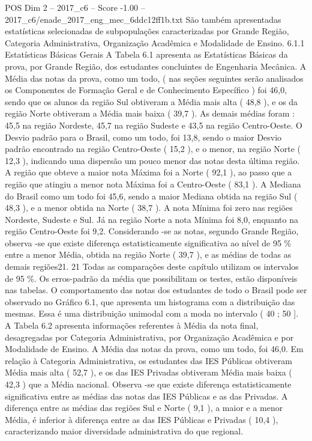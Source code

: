 \begin{textsample}{POS Dim 2 – 2017\_c6 – Score -1.00 – 2017\_c6/enade\_2017\_eng\_mec\_6ddc12ff1b.txt}
São também apresentadas estatísticas selecionadas de subpopulações caracterizadas por Grande Região, Categoria Administrativa, Organização Acadêmica e Modalidade de Ensino. 6.1.1 Estatísticas Básicas Gerais A Tabela 6.1 apresenta as Estatísticas Básicas da prova, por Grande Região, dos estudantes concluintes de Engenharia Mecânica.
A Média das notas da prova, como um todo, ( nas seções seguintes serão analisados os Componentes de Formação Geral e de Conhecimento Específico ) foi 46,0, sendo que os alunos da região Sul obtiveram a Média mais alta ( 48,8 ), e os da região Norte obtiveram a Média mais baixa ( 39,7 ).
As demais médias foram : 45,5 na região Nordeste, 45,7 na região Sudeste e 43,5 na região Centro-Oeste.
O Desvio padrão para o Brasil, como um todo, foi 13,8, sendo o maior Desvio padrão encontrado na região Centro-Oeste ( 15,2 ), e o menor, na região Norte ( 12,3 ), indicando uma dispersão um pouco menor das notas desta última região.
A região que obteve a maior nota Máxima foi a Norte ( 92,1 ), ao passo que a região que atingiu a menor nota Máxima foi a Centro-Oeste ( 83,1 ).
A Mediana do Brasil como um todo foi 45,6, sendo a maior Mediana obtida na região Sul ( 48,3 ), e a menor obtida na Norte ( 38,7 ).
A nota Mínima foi zero nas regiões Nordeste, Sudeste e Sul.
Já na região Norte a nota Mínima foi 8,0, enquanto na região Centro-Oeste foi 9,2.
Considerando -se as notas, segundo Grande Região, observa -se que existe diferença estatisticamente significativa ao nível de 95 \% entre a menor Média, obtida na região Norte ( 39,7 ), e as médias de todas as demais regiões21. 21 Todas as comparações deste capítulo utilizam os intervalos de 95 \%.
Os erros-padrão da média que possibilitam os testes, estão disponíveis nas tabelas.
O comportamento das notas dos estudantes de todo o Brasil pode ser observado no Gráfico 6.1, que apresenta um histograma com a distribuição das mesmas.
Essa é uma distribuição unimodal com a moda no intervalo ( 40 ; 50 ].
A Tabela 6.2 apresenta informações referentes à Média da nota final, desagregadas por Categoria Administrativa, por Organização Acadêmica e por Modalidade de Ensino.
A Média das notas da prova, como um todo, foi 46,0.
Em relação à Categoria Administrativa, os estudantes das IES Públicas obtiveram Média mais alta ( 52,7 ), e os das IES Privadas obtiveram Média mais baixa ( 42,3 ) que a Média nacional.
Observa -se que existe diferença estatisticamente significativa entre as médias das notas das IES Públicas e as das Privadas.
A diferença entre as médias das regiões Sul e Norte ( 9,1 ), a maior e a menor Média, é inferior à diferença entre as das IES Públicas e Privadas ( 10,4 ), caracterizando maior diversidade administrativa do que regional.

\end{textsample}
